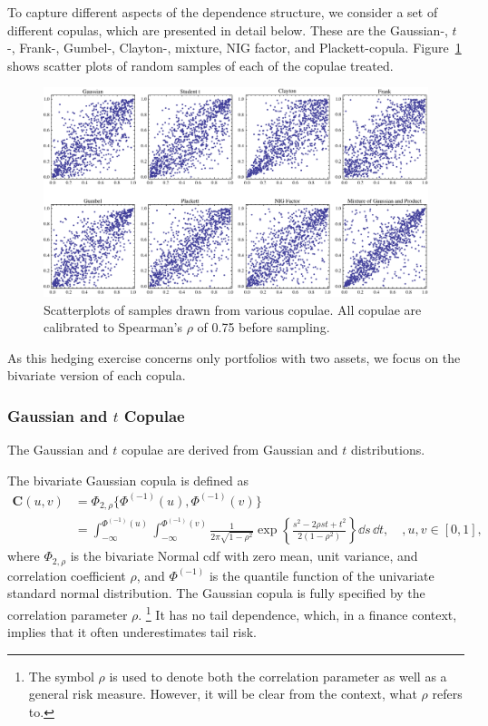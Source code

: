 To capture different aspects of the dependence structure, we consider
a set of different copulas, which are presented in detail below. 
These are the Gaussian-, $t$-, Frank-,
Gumbel-, Clayton-, mixture, NIG factor, and Plackett-copula. 
Figure~\ref{fig:copulaeScatterPlot} shows scatter plots of random
samples of each of the copulae treated. 
\begin{figure}[t]
    \centering
  \includegraphics[width=\textwidth]{_pics/copulas_scatterplots.pdf}
  \caption{Scatterplots of samples drawn from various copulae. All
    copulae are calibrated to Spearman's $\rho$ of 0.75 before
    sampling.}\label{fig:copulaeScatterPlot} 
\end{figure}

As this hedging exercise concerns only portfolios with two assets, we
focus on the bivariate version of each copula. 

\subsubsection{Gaussian and $t$ Copulae}\label{sec:ellpitical-copulae}

The Gaussian and $t$ copulae are derived from Gaussian and $t$
distributions. 

The bivariate Gaussian copula is defined as
\begin{align*}
  \bm{C}(u,v) &= \Phi_{2, \rho}\{\Phi^{(-1)}(u), \Phi^{(-1)}(v)\} \nonumber \\
              &= \int_{-\infty}^{\Phi^{(-1)}(u)}
                \int_{-\infty}^{\Phi^{(-1)}(v)}
                \frac{1}{2\pi\sqrt{1-\rho^2}}
                \exp{\left\{
                \frac{s^2-2\rho st+t^2}{2(1-\rho^2)}
                \right\}} \dd s\, \dd t,\quad, u,v\in [0,1],
\end{align*}
where $\Phi_{2, \rho}$ is the bivariate Normal cdf
with zero mean, unit variance, and correlation coefficient $\rho$, and
$\Phi^{(-1)}$ is the quantile function of the univariate standard normal
distribution.
The Gaussian copula is fully specified by the correlation parameter $\rho$. \footnote{
The symbol $\rho$ is used to denote both the correlation parameter as
well as a general risk measure. However, it will be clear from the
context, what $\rho$ refers to.}
It has no tail dependence, which, in a finance context, implies that
it often underestimates tail risk.  

